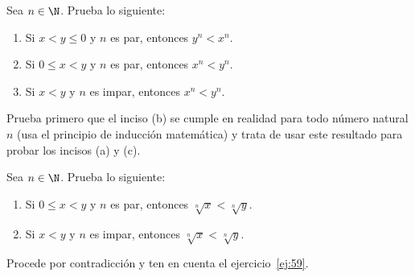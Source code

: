 \documentclass[12pt,a4paper]{book}
\begin{document}
    \begin{ejercicio}\label{ej:59}
        Sea $n\in\N$. Prueba lo siguiente:
        \begin{enumerate}[nosep]
            \item Si $x<y\leq 0$ y $n$ es par, entonces $y^{n}<x^{n}$.
            \item Si $0\leq x<y$ y $n$ es par, entonces $x^{n}<y^{n}$.
            \item Si $x<y$ y $n$ es impar, entonces $x^{n}<y^{n}$.
        \end{enumerate}
        \sugerencia Prueba primero que el inciso (b) se cumple en realidad para
        todo número natural $n$ (usa el principio de inducción matemática) y trata de
        usar este resultado para probar los incisos (a) y (c).
    \end{ejercicio}

    \begin{ejercicio}\label{ej:60}
        Sea $n\in\N$. Prueba lo siguiente:
        \begin{enumerate}[nosep]
            \item Si $0\leq x<y$ y $n$ es par, entonces $\sqrt[n]{x}<\sqrt[n]{y}$.
            \item Si $x<y$ y $n$ es impar, entonces $\sqrt[n]{x}<\sqrt[n]{y}$.
        \end{enumerate}
        \sugerencia Procede por contradicción y ten en cuenta el ejercicio~\ref{ej:59}.
    \end{ejercicio}
\end{document}
